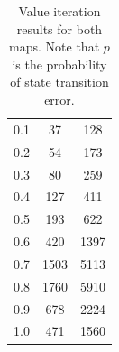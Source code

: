 \documentclass[11pt]{article}
\begin{document}
\begin{table}[h!]
\begin{minipage}{0.5\textwidth}
\begin{tabular}{@{}c|cc@{}}
        0.1          & 37                  & 128                      \\
        0.2          & 54                  & 173                      \\
        0.3          & 80                  & 259                      \\
        0.4          & 127                 & 411                      \\
        0.5          & 193                 & 622                      \\
        0.6          & 420                 & 1397                     \\
        0.7          & 1503                & 5113                     \\
        0.8          & 1760                & 5910                     \\
        0.9          & 678                 & 2224                     \\
        1.0          & 471                 & 1560                     \\ \bottomrule
        \end{tabular}
    \end{minipage}
    \caption{Value iteration results for both maps. Note that $p$ is the probability of state transition error.}\label{table:valueitertable}
\end{table}

\begin{figure}[h!]
    \begin{floatrow}
    \end{floatrow}
\end{figure}
\end{document}
